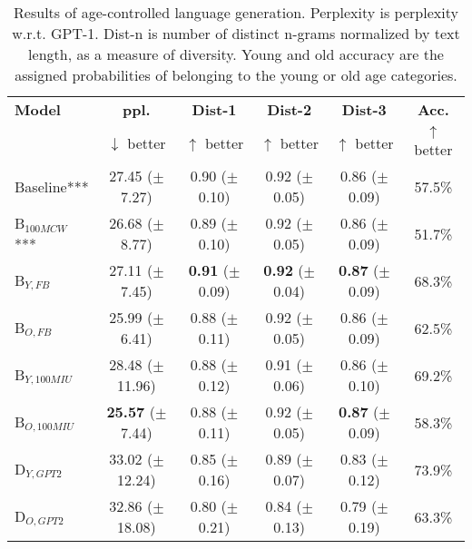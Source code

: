 \begin{table*}[h]
    \centering
    \begin{tabular}{l c c c c c}
    \toprule
    \textbf{Model} & \textbf{ppl.} & \textbf{Dist-1} & \textbf{Dist-2} & \textbf{Dist-3} & \textbf{Acc.}\\
     & $\downarrow$ better & $\uparrow$ better & $\uparrow$ better & $\uparrow$ better & $\uparrow$ better\\
    \midrule
    \midrule
    Baseline*** & 27.45 ($\pm$7.27) & 0.90 ($\pm$0.10) & 0.92 ($\pm$0.05) & 0.86 ($\pm$0.09) & 57.5\%\\
    \midrule
    B$_{100MCW}$*** & 26.68 ($\pm$8.77) & 0.89 ($\pm$0.10) & 0.92 ($\pm$0.05) & 0.86 ($\pm$0.09) & 51.7\%\\
    B$_{Y, FB}$ & 27.11 ($\pm$7.45) & \textbf{0.91} ($\pm$0.09) & \textbf{0.92} ($\pm$0.04) & \textbf{0.87} ($\pm$0.09) & 68.3\%\\
    B$_{O, FB}$ & 25.99 ($\pm$6.41) & 0.88 ($\pm$0.11) & 0.92 ($\pm$0.05) & 0.86 ($\pm$0.09) & 62.5\%\\
    B$_{Y, 100MIU}$ & 28.48 ($\pm$11.96) & 0.88 ($\pm$0.12) & 0.91 ($\pm$0.06) & 0.86 ($\pm$0.10) & 69.2\%\\
    B$_{O, 100MIU}$ & \textbf{25.57} ($\pm$7.44) & 0.88 ($\pm$0.11) & 0.92 ($\pm$0.05) & \textbf{0.87} ($\pm$0.09) & 58.3\%\\
    \midrule
    D$_{Y, GPT2}$ & 33.02 ($\pm$12.24) & 0.85 ($\pm$0.16) & 0.89 ($\pm$0.07) & 0.83 ($\pm$0.12) & 73.9\%\\
    D$_{O, GPT2}$ & 32.86 ($\pm$18.08) & 0.80 ($\pm$0.21) & 0.84 ($\pm$0.13) & 0.79 ($\pm$0.19) & 63.3\%\\
    \bottomrule
    \end{tabular}
    \caption{ Results of age-controlled language generation. Perplexity is perplexity w.r.t. GPT-1. Dist-n is number of distinct n-grams normalized by text length, as a measure of diversity. Young and old accuracy are the assigned probabilities of belonging to the young or old age categories.}
    \label{tab:ctg_results}
\end{table*}